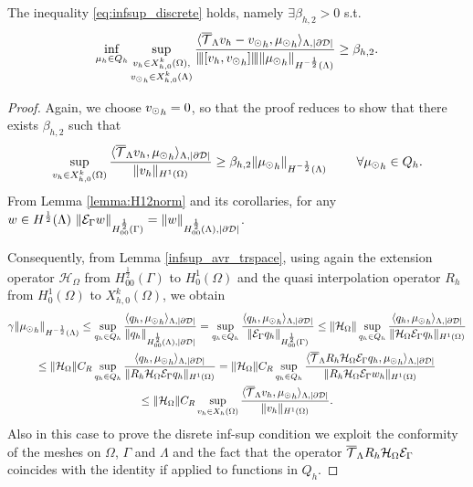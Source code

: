 \begin{theorem} The inequality \eqref{eq:infsup_discrete} holds, namely 
$\exists \beta_{h,2} >0$ s.t.
\begin{equation}
\inf_{\mu_h \in Q_h} 
\sup_{\substack{v_h \in X_{h,0}^k(\Omega),\\ {v_{\odot}}_h \in X_{h,0}^k(\Lambda)} }\frac{\langle {\overline{\mathcal{T}}_\Lambda} v_h -  {v_{\odot}}_h, {\mu_{\odot}}_h \rangle _{\Lambda,|\partial\mathcal{D}|} } {{\left\vert\kern-0.25ex\left\vert\kern-0.25ex\left\vert [v_h, {v_{\odot}}_h] \right\vert\kern-0.25ex\right\vert\kern-0.25ex\right\vert} \|{\mu_{\odot}}_h\|_{H^{-\frac 12 }(\Lambda)} } 
\geq \beta_{h,2}. 
\end{equation}
\end{theorem}
\begin{proof}
 Again, we choose ${v_{\odot}}_h =0$, so that the proof reduces to show that there exists $\beta_{h,2}$ such that
\begin{equation*}
\sup_{v_h \in X_{h,0}^k(\Omega)} \frac{ \langle {\overline{\mathcal{T}}_\Lambda} v_h , {\mu_{\odot}}_h \rangle _{\Lambda,|\partial\mathcal{D}|} } {\|v_h\|_{H^1(\Omega)} }\geq \beta_{h,2} \|{\mu_{\odot}}_h\|_{H^{-\frac 12}(\Lambda)}\ \qquad \forall {\mu_{\odot}}_h \in Q_h.
\end{equation*}
From Lemma \ref{lemma:H12norm} and its corollaries, for any $w \in H^{\frac 12}(\Lambda) \ 
\|\ext w\|_{H^{\frac 12}_{00}(\Gamma)}= \|w\|_{H^{\frac 12}_{00}(\Lambda),|\DD|}$.

Consequently, from Lemma \ref{infsup_avr_trspace}, using again the extension operator $\mathcal{H}_{\Omega}$ from $H^{\frac 12}_{00}(\Gamma)$ to $H^1_0(\Omega)$ and the quasi interpolation operator $R_h$ from $H^1_0(\Omega)$ to $X_{h,0}^k(\Omega)$, we obtain
\begin{multline}
\gamma \|{\md}_h\|_{H^{-\frac 12}(\Lambda)} \leq 
\sup_{q_h \in Q_h} \frac{ \langle q_h, {\md}_h \rangle_{\Lambda,|\DD|} } {\|q_h\|_{H^{\frac 12}_{00}(\Lambda),|\DD|}} 
%
=  \sup_{q_h \in Q_h} \frac{ \langle q_h, {\md}_h \rangle _{\Lambda,|\DD|}} {\|\ext q_h\|_{H^{\frac 12}_{00}(\Gamma)}} 
\leq \|\mathcal{H}_{\Omega}\| \sup_{q_h \in Q_h} \frac{ \langle q_h, {\md}_h \rangle _{\Lambda,|\DD|} } {\|\mathcal{H}_{\Omega} \ext q_h\|_{H^1(\Omega)}} 
\\
\leq \|\mathcal{H}_{\Omega}\| C_R \sup_{q_h \in Q_h} \frac{ \langle q_h, {\md}_h \rangle _{\Lambda,|\DD|} } {\|R_h \mathcal{H}_{\Omega} \ext q_h\|_{H^1(\Omega)}}
%
=  \|\mathcal{H}_{\Omega}\| C_R \sup_{q_h \in Q_h} \frac{ \langle 	\mtrace R_h \mathcal{H}_{\Omega} \ext q_h, {\md}_h \rangle _{\Lambda,|\DD|}} {\|R_h \mathcal{H}_{\Omega} \ext w_h\|_{H^1(\Omega)}}
\\
\leq \|\mathcal{H}_{\Omega}\| C_R \sup_{v_h \in X_h(\Omega)} \frac{ \langle \mtrace v_h, {\md}_h \rangle _{\Lambda,|\DD|}} {\|v_h\|_{H^1(\Omega)}}. 
\end{multline}
Also in this case to prove the disrete inf-sup condition we exploit the conformity of the meshes on $\Omega$, $\Gamma$ and $\Lambda$ and the fact that the operator ${\overline{\mathcal{T}}_\Lambda} R_h \mathcal{H}_{\Omega} \mathcal{E}_\Gamma$ coincides with the identity if applied to functions in $Q_h$. 
\end{proof}